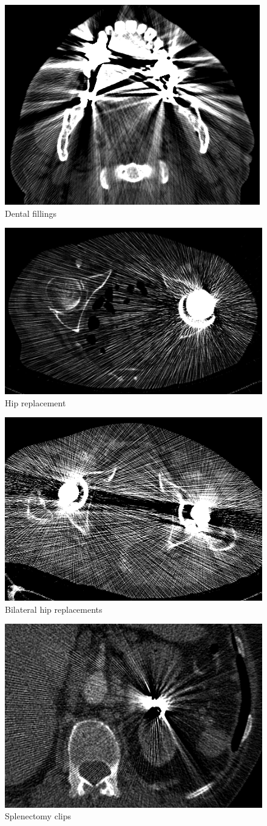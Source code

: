 \begin{figure}[h!]
	\centering
	\includegraphics[width=0.5\linewidth]{images/06_FBP.png}
	\caption{Dental fillings\cite{revisionrads}}
\end{figure}
\begin{figure}[h!]
	\centering
	\includegraphics[width=0.5\linewidth]{images/05_FBP.png}
	\caption{Hip replacement\cite{revisionrads}}
\end{figure}
\begin{figure}[h!]
	\centering
	\includegraphics[width=0.5\linewidth]{images/09_FBP.png}
	\caption{Bilateral hip replacements\cite{revisionrads}}
\end{figure}
\begin{figure}[h!]
	\centering
	\includegraphics[width=0.5\linewidth]{images/01_FBP.png}
	\caption{Splenectomy clips\cite{revisionrads}}
\end{figure}
